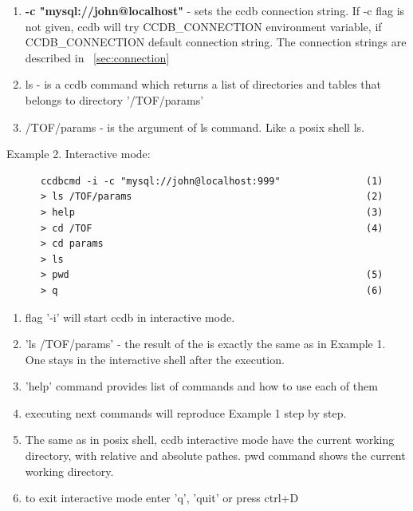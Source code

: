 \documentclass{article}
\begin{document}
\begin{enumerate}
\item \textbf{-c "mysql://john@localhost"} - sets the ccdb connection string.
      If -c flag is not given, ccdb will try CCDB\_CONNECTION environment
      variable, if CCDB\_CONNECTION  default connection string. The connection
      strings are described in ~\ref{sec:connection}

\item ls - is a ccdb command which returns a list of directories and tables
      that belongs to directory '/TOF/params'

\item /TOF/params - is the argument of ls command. Like a posix shell ls.
\end{enumerate}
\vspace{1 em}


Example 2. Interactive mode:
\begin{verbatim}
      ccdbcmd -i -c "mysql://john@localhost:999"               (1)
      > ls /TOF/params                                         (2)
      > help                                                   (3)
      > cd /TOF                                                (4)
      > cd params
      > ls
      > pwd                                                    (5)
      > q                                                      (6)
\end{verbatim}


\begin{enumerate}
  \item flag '-i'  will start ccdb in interactive mode.

  \item 'ls /TOF/params' - the result of the is exactly the same as in Example 1.
         One stays in the interactive shell after the execution.

  \item 'help' command provides list of commands and how to use each of them

  \item executing next commands will reproduce Example 1 step by step.

  \item  The same as in posix shell, ccdb interactive mode have the current
         working directory, with relative and absolute pathes.
         pwd command shows the current working directory.

  \item to exit interactive mode enter 'q', 'quit' or press ctrl+D
\end{enumerate}
\end{document}
